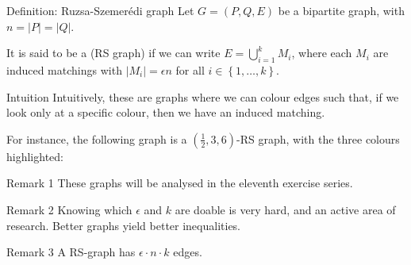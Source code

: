 \documentclass[a4paper]{article}
\begin{document}
\begin{parag}{Definition: Ruzsa-Szemerédi graph}
    Let $G = \left(P, Q, E\right)$ be a bipartite graph, with $n = \left|P\right| = \left|Q\right|$.

    It is said to be a  (RS graph) if we can write $E = \bigcup_{i=1}^{k} M_i$, where each $M_i$ are induced matchings with $\left|M_i\right| = \epsilon n$ for all $i \in \left\{1, \ldots, k\right\}$.

    \begin{subparag}{Intuition}
        Intuitively, these are graphs where we can colour edges such that, if we look only at a specific colour, then we have an induced matching. 

        For instance, the following graph is a $\left(\frac{1}{2}, 3, 6\right)$-RS graph, with the three colours highlighted:
    \end{subparag}

    \begin{subparag}{Remark 1}
        These graphs will be analysed in the eleventh exercise series.
    \end{subparag}

    \begin{subparag}{Remark 2}
        Knowing which $\epsilon$ and $k$ are doable is very hard, and an active area of research. Better graphs yield better inequalities.
    \end{subparag}
    
    \begin{subparag}{Remark 3}
        A RS-graph has $\epsilon\cdot n\cdot k$ edges.
    \end{subparag}
\end{parag}
\end{document}
